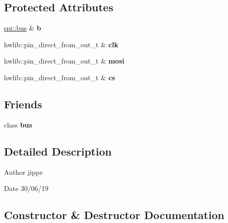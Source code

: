 \subsection*{Protected Attributes}
\begin{DoxyCompactItemize}
\item 
\mbox{\label{classspi_1_1transaction_a79a1998291c7bdda36bbe6032ca435b0}} 
\hyperlink{classspi_1_1bus}{spi\+::bus} \& {\bfseries b}
\item 
\mbox{\label{classspi_1_1transaction_a151ffe9c3e72d729f19c4c031219103c}} 
hwlib\+::pin\+\_\+direct\+\_\+from\+\_\+out\+\_\+t \& {\bfseries clk}
\item 
\mbox{\label{classspi_1_1transaction_a2a4413e78e15bac3a4c9b7b34aaf2dfb}} 
hwlib\+::pin\+\_\+direct\+\_\+from\+\_\+out\+\_\+t \& {\bfseries mosi}
\item 
\mbox{\label{classspi_1_1transaction_aad942ddbe449313ee48318630be51763}} 
hwlib\+::pin\+\_\+direct\+\_\+from\+\_\+out\+\_\+t \& {\bfseries cs}
\end{DoxyCompactItemize}
\subsection*{Friends}
\begin{DoxyCompactItemize}
\item 
\mbox{\label{classspi_1_1transaction_a9accf8f4a4eb84d3e49821c094916733}} 
class {\bfseries bus}
\end{DoxyCompactItemize}


\subsection{Detailed Description}
\begin{DoxyAuthor}{Author}
jippe 
\end{DoxyAuthor}
\begin{DoxyDate}{Date}
30/06/19 
\end{DoxyDate}


\subsection{Constructor \& Destructor Documentation}
\mbox{\label{classspi_1_1transaction_a036b6dc350f32eba0398d6914967cf5a}} 
